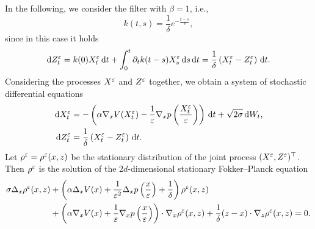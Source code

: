 \documentclass[10pt]{article}
\begin{document}
In the following, we consider the filter with $\beta = 1$, i.e.,
\begin{equation}
	k(t,s) = \frac{1}{\delta} e^{-\frac{t-s}{\delta}},
\end{equation}
since in this case it holds
\begin{equation}
	\mathrm{d} Z^\varepsilon_t = k(0) X^\varepsilon_t \,\mathrm{d} t + \int_0^t \partial_t k(t-s) X^\varepsilon_s \,\mathrm{d} s \,\mathrm{d} t = \frac{1}{\delta} \left ( X^\varepsilon_t - Z^\varepsilon_t \right ) \,\mathrm{d} t.
\end{equation}
Considering the processes $X^\varepsilon$ and $Z^\varepsilon$ together, we obtain a system of stochastic differential equations
\begin{equation}
\label{systemSDE}
\begin{aligned}
\mathrm{d} X^\varepsilon_t &= -\left( \alpha \nabla_x V(X^\varepsilon_t) - \frac{1}{\varepsilon} \nabla_x p \left ( \frac{X^\varepsilon_t}{\varepsilon} \right ) \right ) \,\mathrm{d} t + \sqrt{2\sigma} \,\mathrm{d} W_t, \\
\mathrm{d} Z^\varepsilon_t &= \frac{1}{\delta} \left ( X^\varepsilon_t - Z^\varepsilon_t \right ) \,\mathrm{d} t.
\end{aligned}
\end{equation}
Let $\rho^\varepsilon = \rho^\varepsilon(x,z)$ be the stationary distribution of the joint process $(X^\varepsilon, Z^\varepsilon)^\top$. Then $\rho^\varepsilon$ is the solution of the $2d$-dimensional stationary Fokker--Planck equation
\begin{equation}
\begin{aligned}
	\label{eq:FPsystem}
	\sigma \Delta_x \rho^\varepsilon(x,z) & + \left ( \alpha  \Delta_x V(x) + \frac{1}{\varepsilon^2} \Delta_x p \left( \frac{x}{\varepsilon} \right) + \frac1\delta \right) \rho^\varepsilon(x,z) \\
	& + \left ( \alpha \nabla_x V(x) + \frac{1}{\varepsilon} \nabla_x p \left ( \frac{x}{\varepsilon} \right ) \right ) \cdot \nabla_x \rho^\varepsilon(x,z) + \frac{1}{\delta}(z - x) \cdot \nabla_z \rho^\varepsilon(x,z) = 0.
\end{aligned}
\end{equation}
\end{document}
